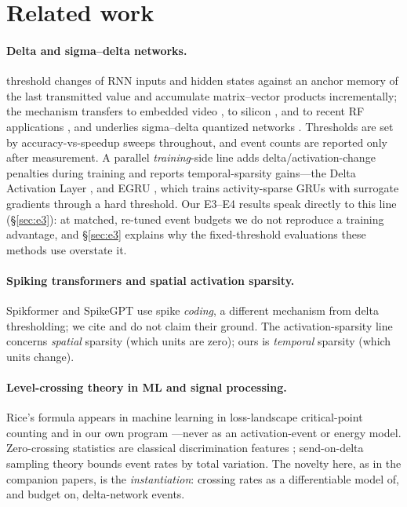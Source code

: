 \documentclass[10pt]{article}
\begin{document}
\section{Related work}
\label{sec:related}

\paragraph{Delta and sigma--delta networks.}
\citet{neil2017delta} threshold changes of RNN inputs and hidden states
against an anchor memory of the last transmitted value and accumulate
matrix--vector products incrementally; the mechanism transfers to embedded
video \citep{yousefzadeh2022delta}, to silicon
\citep{gao2020edgedrnn,chen2024deltakws}, and to recent RF applications
\citep{wu2025deltadpd}, and underlies sigma--delta quantized networks
\citep{oconnor2017sigmadelta}. Thresholds are set by accuracy-vs-speedup
sweeps throughout, and event counts are reported only after measurement. A
parallel \emph{training}-side line adds delta/activation-change penalties
during training and reports temporal-sparsity gains---the Delta Activation
Layer \citep{yousefzadeh2021training,yousefzadeh2022delta}, and EGRU
\citep{subramoney2023egru}, which trains activity-sparse GRUs with surrogate
gradients through a hard threshold. Our E3--E4 results speak directly to this
line (\S\ref{sec:e3}): at matched, re-tuned event budgets we do not reproduce
a training advantage, and \S\ref{sec:e3} explains why the fixed-threshold
evaluations these methods use overstate it.

\paragraph{Spiking transformers and spatial activation sparsity.}
Spikformer \citep{zhou2023spikformer} and SpikeGPT \citep{zhu2023spikegpt}
use spike \emph{coding}, a different mechanism from delta thresholding; we
cite and do not claim their ground. The activation-sparsity line
\citep{li2023lazy} concerns \emph{spatial} sparsity (which units are zero);
ours is \emph{temporal} sparsity (which units change).

\paragraph{Level-crossing theory in ML and signal processing.}
Rice's formula appears in machine learning in loss-landscape critical-point
counting \citep{bray2007,choromanska2015} and in our own program
\citep{howe2026levelcrossing,howe2026budget,howe2026minkowski}---never as an
activation-event or energy model. Zero-crossing statistics are classical
discrimination features \citep{kedem1986,kedem1994book}; send-on-delta
sampling theory \citep{miskowicz2006} bounds event rates by total
variation. The novelty here, as in the companion papers, is the
\emph{instantiation}: crossing rates as a differentiable model of, and
budget on, delta-network events.
\end{document}
